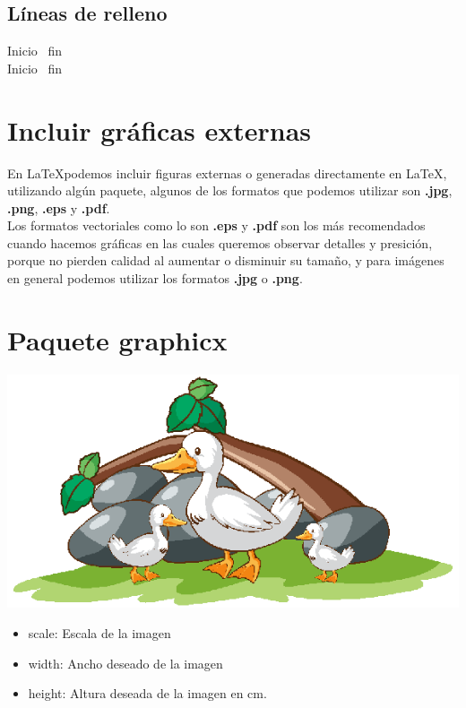 \documentclass[12pt]{article}
\begin{document}
\subsection{Líneas de relleno}
Inicio \hrulefill \ fin\\[5mm]
Inicio \dotfill \ fin

\section{Incluir gráficas externas}
En \LaTeX podemos incluir figuras externas o 
generadas directamente en \LaTeX, utilizando algún
paquete, algunos de los formatos que podemos 
utilizar son \textbf{.jpg}, \textbf{.png},
\textbf{.eps} y \textbf{.pdf}.\\[5mm]

Los formatos vectoriales como lo son \textbf{.eps}
y \textbf{.pdf} son los más recomendados cuando
hacemos gráficas en las cuales queremos observar
detalles y presición, porque no pierden calidad al
aumentar o disminuir su tamaño, y para imágenes en
general podemos utilizar los formatos \textbf{.jpg}
o \textbf{.png}.

\section{Paquete graphicx}
\begin{center}
\includegraphics[scale=0.5]{figures/image1.eps}
\end{center}

\begin{itemize}
\item scale: Escala de la imagen
\item width: Ancho deseado de la imagen
\item height: Altura deseada de la imagen en cm.
\end{itemize}
\end{document}
